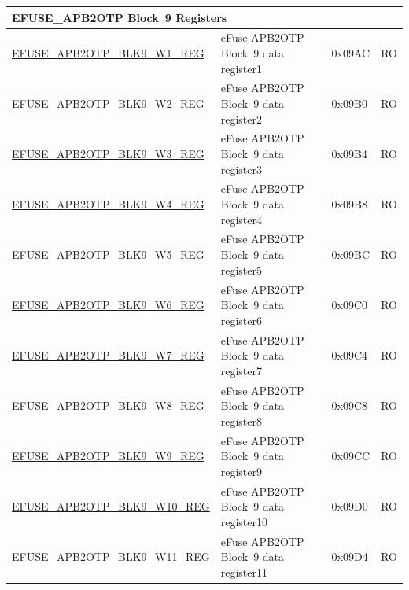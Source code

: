 \begin{longtable}{ | p{7cm} | p{6cm} | p{1.2cm} | p{1.5cm} | }
\multicolumn{4}{|l|}{\textbf{EFUSE\_APB2OTP Block~9 Registers}} \\ \hline
\hyperref[regdesc:EFUSEAPB2OTPBLK9WNREG]{EFUSE\_APB2OTP\_BLK9\_W1\_REG} & eFuse APB2OTP Block~9 data register1 & 0x09AC & RO \\\hline
\hyperref[regdesc:EFUSEAPB2OTPBLK9WNREG]{EFUSE\_APB2OTP\_BLK9\_W2\_REG} & eFuse APB2OTP Block~9 data register2 & 0x09B0 & RO \\\hline
\hyperref[regdesc:EFUSEAPB2OTPBLK9WNREG]{EFUSE\_APB2OTP\_BLK9\_W3\_REG} & eFuse APB2OTP Block~9 data register3 & 0x09B4 & RO \\\hline
\hyperref[regdesc:EFUSEAPB2OTPBLK9WNREG]{EFUSE\_APB2OTP\_BLK9\_W4\_REG} & eFuse APB2OTP Block~9 data register4 & 0x09B8 & RO \\\hline
\hyperref[regdesc:EFUSEAPB2OTPBLK9WNREG]{EFUSE\_APB2OTP\_BLK9\_W5\_REG} & eFuse APB2OTP Block~9 data register5 & 0x09BC & RO \\\hline
\hyperref[regdesc:EFUSEAPB2OTPBLK9WNREG]{EFUSE\_APB2OTP\_BLK9\_W6\_REG} & eFuse APB2OTP Block~9 data register6 & 0x09C0 & RO \\\hline
\hyperref[regdesc:EFUSEAPB2OTPBLK9WNREG]{EFUSE\_APB2OTP\_BLK9\_W7\_REG} & eFuse APB2OTP Block~9 data register7 & 0x09C4 & RO \\\hline
\hyperref[regdesc:EFUSEAPB2OTPBLK9WNREG]{EFUSE\_APB2OTP\_BLK9\_W8\_REG} & eFuse APB2OTP Block~9 data register8 & 0x09C8 & RO \\\hline
\hyperref[regdesc:EFUSEAPB2OTPBLK9WNREG]{EFUSE\_APB2OTP\_BLK9\_W9\_REG} & eFuse APB2OTP Block~9 data register9 & 0x09CC & RO \\\hline
\hyperref[regdesc:EFUSEAPB2OTPBLK9WNREG]{EFUSE\_APB2OTP\_BLK9\_W10\_REG} & eFuse APB2OTP Block~9 data register10 & 0x09D0 & RO \\\hline
\hyperref[regdesc:EFUSEAPB2OTPBLK9WNREG]{EFUSE\_APB2OTP\_BLK9\_W11\_REG} & eFuse APB2OTP Block~9 data register11 & 0x09D4 & RO \\\hline



\end{longtable}
